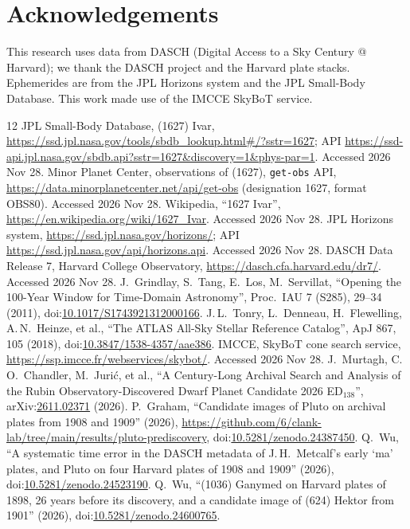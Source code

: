 \documentclass[11pt]{article}
\begin{document}
\section*{Acknowledgements}
This research uses data from DASCH (Digital Access to a Sky Century @ Harvard); we thank the DASCH project and the Harvard plate stacks. Ephemerides are from the JPL Horizons system and the JPL Small-Body Database. This work made use of the IMCCE SkyBoT service.

\begin{thebibliography}{12}
 JPL Small-Body Database, (1627) Ivar, \url{https://ssd.jpl.nasa.gov/tools/sbdb_lookup.html#/?sstr=1627}; API \url{https://ssd-api.jpl.nasa.gov/sbdb.api?sstr=1627&discovery=1&phys-par=1}. Accessed 2026 Nov 28.
 Minor Planet Center, observations of (1627), \texttt{get-obs} API, \url{https://data.minorplanetcenter.net/api/get-obs} (designation 1627, format OBS80). Accessed 2026 Nov 28.
 Wikipedia, ``1627 Ivar'', \url{https://en.wikipedia.org/wiki/1627_Ivar}. Accessed 2026 Nov 28.
 JPL Horizons system, \url{https://ssd.jpl.nasa.gov/horizons/}; API \url{https://ssd.jpl.nasa.gov/api/horizons.api}. Accessed 2026 Nov 28.
 DASCH Data Release 7, Harvard College Observatory, \url{https://dasch.cfa.harvard.edu/dr7/}. Accessed 2026 Nov 28.
 J.~Grindlay, S.~Tang, E.~Los, M.~Servillat, ``Opening the 100-Year Window for Time-Domain Astronomy'', Proc.\ IAU 7 (S285), 29--34 (2011), doi:\href{https://doi.org/10.1017/S1743921312000166}{10.1017/S1743921312000166}.
 J.\,L.~Tonry, L.~Denneau, H.~Flewelling, A.\,N.~Heinze, et al., ``The ATLAS All-Sky Stellar Reference Catalog'', ApJ 867, 105 (2018), doi:\href{https://doi.org/10.3847/1538-4357/aae386}{10.3847/1538-4357/aae386}.
 IMCCE, SkyBoT cone search service, \url{https://ssp.imcce.fr/webservices/skybot/}. Accessed 2026 Nov 28.
 J.~Murtagh, C.\,O.~Chandler, M.~Juri\'c, et al., ``A Century-Long Archival Search and Analysis of the Rubin Observatory-Discovered Dwarf Planet Candidate 2026 ED$_{138}$'', arXiv:\href{https://arxiv.org/abs/2611.02371}{2611.02371} (2026).
 P.~Graham, ``Candidate images of Pluto on archival plates from 1908 and 1909'' (2026), \url{https://github.com/6/clank-lab/tree/main/results/pluto-prediscovery}, doi:\href{https://doi.org/10.5281/zenodo.24387450}{10.5281/zenodo.24387450}.
 Q.~Wu, ``A systematic time error in the DASCH metadata of J.\,H.~Metcalf's early `ma' plates, and Pluto on four Harvard plates of 1908 and 1909'' (2026), doi:\href{https://doi.org/10.5281/zenodo.24523190}{10.5281/zenodo.24523190}.
 Q.~Wu, ``(1036) Ganymed on Harvard plates of 1898, 26 years before its discovery, and a candidate image of (624) Hektor from 1901'' (2026), doi:\href{https://doi.org/10.5281/zenodo.24600765}{10.5281/zenodo.24600765}.
\end{thebibliography}
\end{document}
